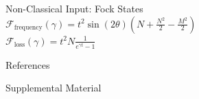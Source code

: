 \documentclass[final]{beamer}
\newlength{\sepwidth}
\newlength{\colwidth}
\newcommand{\separatorcolumn}{\begin{column}{\sepwidth}\end{column}}
\begin{document}
\begin{frame}[t]
\begin{columns}[t]
\begin{column}{\colwidth}
\begin{exampleblock}{Non-Classical Input: Fock States}
         \LARGE{$\mathcal{F}_{\text{frequency}}(\gamma) = t^{2}\sin(2\theta)\left( N+\frac{N^{2}}{2}-\frac{M^{2}}{2}\right)$}\\
         \LARGE{$\mathcal{F}_{\text{loss}}(\gamma) = t^{2}N \frac{1}{e^{\gamma t}-1}$}
  \end{exampleblock}


  \begin{block}{References}

    \nocite{*}
    \footnotesize{}

  \end{block}

  \begin{block}{Supplemental Material}
    
  \end{block}

\end{column}
\separatorcolumn
\end{columns}
\end{frame}
\end{document}
